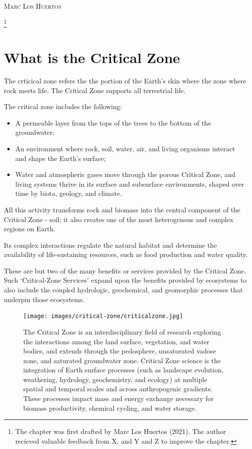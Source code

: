 \documentclass{book}\usepackage{knitr}
\makeatletter
\newcommand{\chapterauthor}[1]{%
  {\parindent0pt\vspace*{-25pt}%
  \linespread{1.1}\large\scshape#1%
  \par\nobreak\vspace*{35pt}}
  \@afterheading%
}
\makeatother
\begin{document}
\chapterauthor{Marc Los Huertos}\footnote{The chapter was first drafted by Marc Los Huertos (2021). The author recieved valuable feedback from X, and Y and Z to improve the chapter.}

\section{What is the Critical Zone}

The crticical zone refers the the portion of the Earth's skin where the zone where rock meets life. The Critical Zone supports all terrestrial life.

The critical zone includes the following:

\begin{itemize}
  \item A permeable layer from the tops of the trees to the bottom of the groundwater;
  \item An environment where rock, soil, water, air, and living organisms interact and shape the Earth's surface;
  \item Water and atmospheric gases move through the porous Critical Zone, and living systems thrive in its surface and subsurface environments, shaped over time by biota, geology, and climate.
\end{itemize}

All this activity transforms rock and biomass into the central component of the Critical Zone - soil; it also creates one of the most heterogenous and complex regions on Earth.

Its complex interactions regulate the natural habitat and determine the availability of life-sustaining resources, such as food production and water quality.

These are but two of the many benefits or services provided by the Critical Zone. Such `Critical-Zone Services' expand upon the benefits provided by ecosystems to also include the coupled hydrologic, geochemical, and geomorphic processes that underpin those ecosystems.

\begin{figure}
\texttt{[image: images/critical-zone/criticalzone.jpg]}
\caption{The Critical Zone is an interdisciplinary field of research exploring the interactions among the land surface, vegetation, and water bodies, and extends through the pedosphere, unsaturated vadose zone, and saturated groundwater zone. Critical Zone science is the integration of Earth surface processes (such as landscape evolution, weathering, hydrology, geochemistry, and ecology) at multiple spatial and temporal scales and across anthropogenic gradients. These processes impact mass and energy exchange necessary for biomass productivity, chemical cycling, and water storage.}
\label{fig:criticalzone}
\end{figure}
\end{document}
